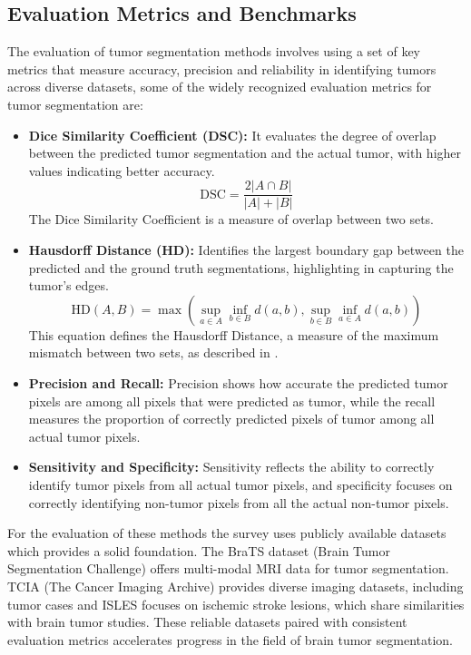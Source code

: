 \documentclass[conference]{IEEEtran}
\begin{document}
\subsection{Evaluation Metrics and Benchmarks}
The evaluation of  tumor segmentation methods involves using a set of key metrics that measure accuracy, precision and reliability in identifying tumors across diverse datasets, some of the widely recognized evaluation metrics for tumor segmentation are:

\begin{itemize}
    \item \textbf{Dice Similarity Coefficient (DSC):} It evaluates the degree of overlap between the predicted tumor segmentation and the actual tumor, with higher values indicating better accuracy.
    \[
    \text{DSC} = \frac{2 |A \cap B|}{|A| + |B|}
    \]
    The Dice Similarity Coefficient is a measure of overlap between two sets\cite{b11}.
    
    \item \textbf{Hausdorff Distance (HD):} Identifies the largest boundary gap between the predicted and the ground truth segmentations, highlighting in capturing the tumor’s edges.
    \[
    \text{HD}(A, B) = \max \left( \sup_{a \in A} \inf_{b \in B} d(a, b), \sup_{b \in B} \inf_{a \in A} d(a, b) \right)
    \]
    This equation defines the Hausdorff Distance, a measure of the maximum mismatch between two sets, as described in \cite{b12}.
    
    \item \textbf{Precision and Recall:} Precision shows how accurate the predicted tumor pixels are among all pixels that were predicted as tumor, while the recall measures the proportion of correctly predicted pixels of tumor among all actual tumor pixels.
    
    \item \textbf{Sensitivity and Specificity:} Sensitivity reflects the ability to correctly identify tumor pixels from all actual tumor pixels, and specificity focuses on correctly identifying non-tumor pixels from all the actual non-tumor pixels.
\end{itemize}
For the evaluation of these methods the survey uses publicly available datasets which provides a solid foundation. The BraTS dataset (Brain Tumor Segmentation Challenge) offers multi-modal MRI data for tumor segmentation. TCIA (The Cancer Imaging Archive) provides diverse imaging datasets, including tumor cases and ISLES focuses on ischemic stroke lesions, which share similarities with brain tumor studies. These reliable datasets paired with consistent evaluation metrics accelerates progress in the field of brain tumor segmentation.
\end{document}
